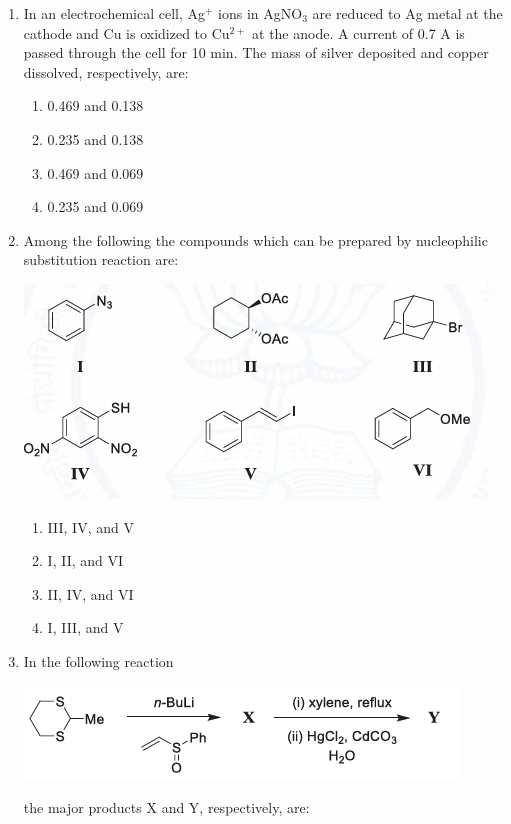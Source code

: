 \documentclass[journal,12pt,onecolumn]{IEEEtran}
\begin{document}
\begin{enumerate}
    \item In an electrochemical cell, Ag$^+$ ions in AgNO$_3$ are reduced to Ag metal at the cathode and Cu is oxidized to Cu$^{2+}$ at the anode. A current of 0.7 A is passed through the cell for 10 min. The mass  of silver deposited and copper dissolved, respectively, are: 
    \begin{multicols}{2}
    \begin{enumerate}
        \item 0.469 and 0.138
        \item 0.235 and 0.138
        \item 0.469 and 0.069
        \item 0.235 and 0.069
    \end{enumerate}
    \end{multicols}
    \hfill{}
    
    \item Among the following the compounds which can be prepared by nucleophilic substitution reaction are:
    \begin{center}
    \includegraphics[width=0.8\columnwidth]{figs/q45.png}
    \end{center}
    \begin{multicols}{2}
    \begin{enumerate}
        \item III, IV, and V
        \item I, II, and VI
        \item II, IV, and VI
        \item I, III, and V
    \end{enumerate}
    \end{multicols}
    \hfill{}

    \item In the following reaction
    \begin{center}
    \includegraphics[width=0.8\columnwidth]{figs/q46.png}
    \end{center}
    the major products X and Y, respectively, are:


\end{enumerate}
\end{document}
